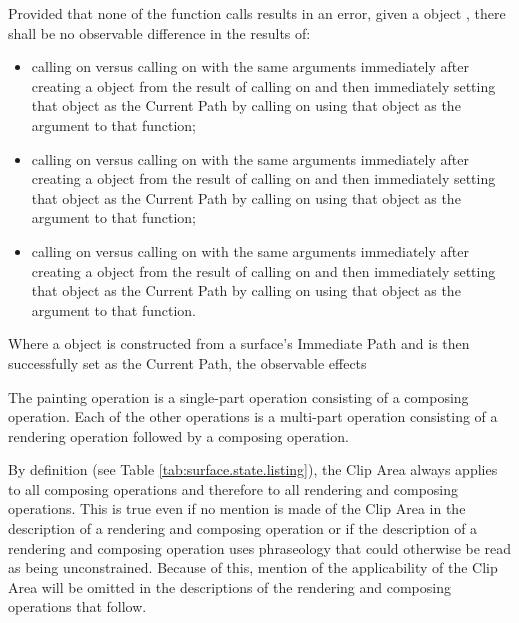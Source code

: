 \pnum
Provided that none of the function calls results in an error, given a  object , there shall be no observable difference in the results of:
\begin{itemize}
	\item calling  on  versus calling  on  with the same arguments immediately after creating a  object from the result of calling  on  and then immediately setting that  object as the Current Path by calling  on  using that  object as the argument to that function;
	\item calling  on  versus calling  on  with the same arguments immediately after creating a  object from the result of calling  on  and then immediately setting that  object as the Current Path by calling  on  using that  object as the argument to that function;
	\item calling  on  versus calling  on  with the same arguments immediately after creating a  object from the result of calling  on  and then immediately setting that  object as the Current Path by calling  on  using that  object as the argument to that function.
\end{itemize}

\pnum
Where a  object is constructed from a surface's Immediate Path and is then successfully set as the Current Path, the observable effects

\pnum
The painting operation is a single-part operation consisting of a composing operation. Each of the other operations is a multi-part operation consisting of a rendering operation followed by a composing operation.

\pnum
\enternote
By definition (see Table \ref{tab:surface.state.listing}), the Clip Area always applies to all composing operations and therefore to all rendering and composing operations. This is true even if no mention is made of the Clip Area in the description of a rendering and composing operation or if the description of a rendering and composing operation uses phraseology that could otherwise be read as being unconstrained. Because of this, mention of the applicability of the Clip Area will be omitted in the descriptions of the rendering and composing operations that follow.
\exitnote

